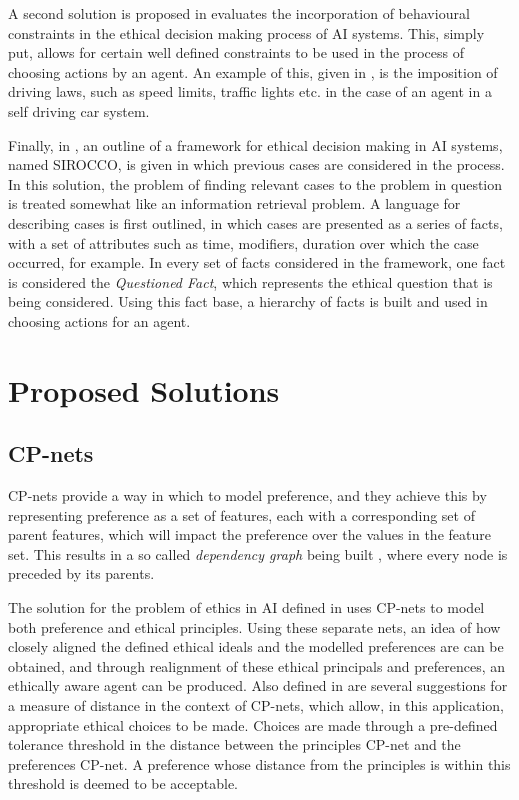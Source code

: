 \documentclass{svproc}
\begin{document}
\par
A second solution is proposed in \cite{balakrishnan} evaluates the incorporation of behavioural constraints in the ethical decision making process of AI systems. This, simply put, allows for certain well defined constraints to be used in the process of choosing actions by an agent. An example of this, given in \cite{kjoelen1995performance}, is the imposition of driving laws, such as speed limits, traffic lights etc. in the case of an agent in a self driving car system.
\par
Finally, in \cite{sirocco}, an outline of a framework for ethical decision making in AI systems, named SIROCCO, is given in which previous cases are considered in the process. In this solution, the problem of finding relevant cases to the problem in question is treated somewhat like an information retrieval problem. A language for describing cases is first outlined, in which cases are presented as a series of facts, with a set of attributes such as time, modifiers, duration over which the case occurred, for example. In every set of facts considered in the framework, one fact is considered the \textit{Questioned Fact}, which represents the ethical question that is being considered. Using this fact base, a hierarchy of facts is built and used in choosing actions for an agent.

\section{Proposed Solutions}
\subsection{CP-nets}
\par
CP-nets provide a way in which to model preference, and they achieve this by representing preference as a set of features, each with a corresponding set of parent features, which will impact the preference over the values in the feature set. This results in a so called \textit{dependency graph} being built \cite{loreggia}, where every node is preceded by its parents.
\par
The solution for the problem of ethics in AI defined in \cite{loreggia} uses CP-nets to model both preference and ethical principles. Using these separate nets, an idea of how closely aligned the defined ethical ideals and the modelled preferences are can be obtained, and through realignment of these ethical principals and preferences, an ethically aware agent can be produced. Also defined in \cite{loreggia} are several suggestions for a measure of distance in the context of CP-nets, which allow, in this application, appropriate ethical choices to be made. Choices are made through a pre-defined tolerance threshold in the distance between the principles CP-net and the preferences CP-net. A preference whose distance from the principles is within this threshold is deemed to be acceptable.
\end{document}
